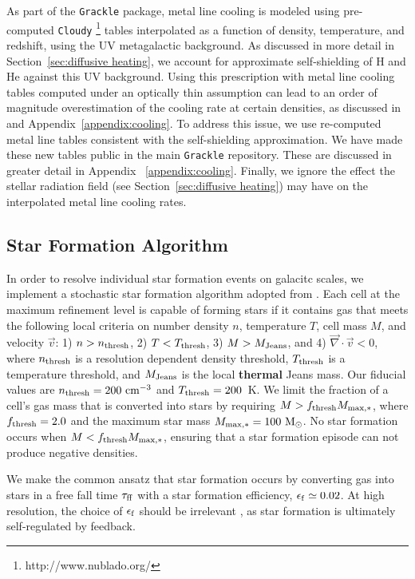 \documentclass[fleqn,usenatbib,useAMS]{mnras}
\begin{document}
As part of the \texttt{Grackle} package, metal line cooling is modeled using pre-computed \texttt{Cloudy} \citep{Cloudy2013} \footnote{http://www.nublado.org/} tables interpolated as a function of density, temperature, and redshift, using the \citet{HM2012} UV metagalactic background. As discussed in more detail in Section~\ref{sec:diffusive heating}, we account for approximate self-shielding of H and He against this UV background. Using this prescription with metal line cooling tables computed under an optically thin assumption can lead to an order of magnitude overestimation of the cooling rate at certain densities, as discussed in \citet{Hu2017} and  Appendix~\ref{appendix:cooling}. To address this issue, we use re-computed metal line tables consistent with the self-shielding approximation.  We have made these new tables public in the main \texttt{Grackle} repository. These are discussed in greater detail in Appendix ~\ref{appendix:cooling}. Finally, we ignore the effect the stellar radiation field (see Section~\ref{sec:diffusive heating}) may have on the interpolated metal line cooling rates. 

\subsection{Star Formation Algorithm}
\label{sec:star formation}
In order to resolve individual star formation events on galacitc scales, we implement a stochastic star formation algorithm adopted from \citet{Goldbaum2015,Goldbaum2016}. Each cell at the maximum refinement level is capable of forming stars if it contains gas that meets the following local criteria on number density $n$, temperature $T$, cell mass $M$, and velocity $\vec{v}$: 1) $n > n_{\rm thresh}$, 2) $T < T_{\rm thresh}$, 3) $M > M_{\rm Jeans}$, and 4) $\vec{\nabla} \cdot \vec{v} < 0$, where $n_{\rm thresh}$ is a resolution dependent density threshold, $T_{\rm thresh}$ is a temperature threshold, and $M_{\rm Jeans}$ is the local \textbf{thermal} Jeans mass. Our fiducial values are $n_{\rm thresh} =  200 \mbox{ cm}^{-3}$ and $T_{\rm thresh}= 200$~K. We limit the fraction of a cell's gas mass that is converted into stars by requiring $M > f_{\rm thresh} M_{\rm max,*}$, where $f_{\rm thresh} = 2.0 $ and the maximum star mass $M_{\rm max,*} = 100 \mbox{ M}_{\odot}$. No star formation occurs when $M < f_{\rm thresh} M_{\rm max,*}$, ensuring that a star formation episode can not produce negative densities.

We make the common ansatz that star formation occurs by converting gas into stars in a free fall time $\tau_{\rm ff}$ with a star formation efficiency, $\epsilon_{\rm f} \simeq 0.02$. At high resolution, the choice of $\epsilon_{\rm f}$ should be irrelevant \citep{Orr2017, FIRE2}, as star formation is ultimately self-regulated by feedback.
\end{document}
